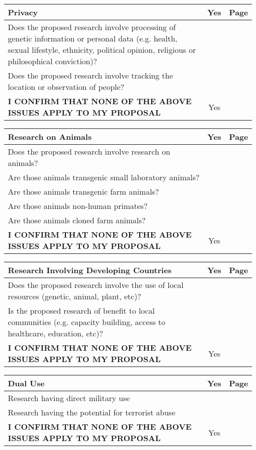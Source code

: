 \begin{minipage}{1\columnwidth}
  \begin{tabular}{|p{}|c|c|}
     \hline
     \textbf{Privacy} & Yes & Page\\\hline
     Does the proposed research involve processing of genetic information or personal data (e.g. health, sexual lifestyle, ethnicity, political opinion, religious or philosophical conviction)? & &\\\hline
     Does the proposed research involve tracking the location or observation of people?
 & &\\\hline
     \textbf{I CONFIRM THAT NONE OF THE ABOVE ISSUES APPLY TO MY PROPOSAL} & Yes & \\\hline
  \end{tabular}

  \begin{tabular}{|p{}|c|c|}
     \hline
     \textbf{Research on Animals} & Yes & Page\\\hline
     Does the proposed research involve research on animals?
 & &\\\hline
     Are those animals transgenic small laboratory animals?
 & &\\\hline
     Are those animals transgenic farm animals?
 & &\\\hline
     Are those animals non-human primates?
 & &\\\hline
     Are those animals cloned farm animals?
 & &\\\hline
     \textbf{I CONFIRM THAT NONE OF THE ABOVE ISSUES APPLY TO MY PROPOSAL} & Yes & \\\hline
  \end{tabular}

  \begin{tabular}{|p{}|c|c|}
     \hline
     \textbf{Research Involving Developing Countries} & Yes & Page\\\hline
     Does the proposed research involve the use of local resources (genetic, animal, plant, etc)? & &\\\hline
     Is the proposed research of benefit to local communities (e.g. capacity building, access to healthcare, education, etc)?
 & &\\\hline
     \textbf{I CONFIRM THAT NONE OF THE ABOVE ISSUES APPLY TO MY PROPOSAL} & Yes & \\\hline
  \end{tabular}

  \begin{tabular}{|p{}|c|c|}
     \hline
     \textbf{Dual Use} & Yes & Page\\\hline
     Research having direct military use & &\\\hline
     Research having the potential for terrorist abuse & &\\\hline
     \textbf{I CONFIRM THAT NONE OF THE ABOVE ISSUES APPLY TO MY PROPOSAL} & Yes &  \\\hline
  \end{tabular}

  \end{minipage}
\newpage